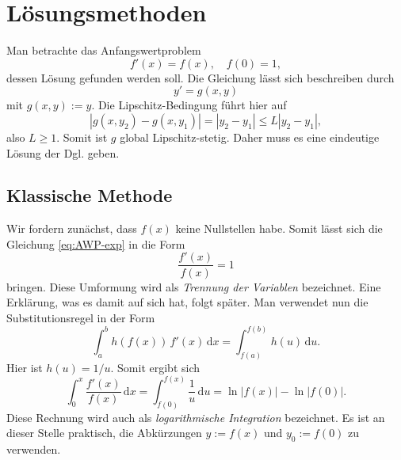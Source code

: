 \documentclass[a4paper,10pt,fleqn,twocolumn,twoside,openany]{scrartcl}
\numberwithin{equation}{section}
\theoremstyle{definition}
\begin{document}
\section{Lösungsmethoden}
Man betrachte das Anfangswertproblem
\begin{equation}\label{eq:AWP-exp}
f'(x) = f(x), \quad f(0)=1,
\end{equation}
dessen Lösung gefunden werden soll. Die Gleichung lässt sich
beschreiben durch
\begin{equation}
y' = g(x,y)
\end{equation}
mit $g(x,y):=y$. Die Lipschitz-Bedingung führt hier auf%
\begin{equation}
|g(x,y_2)-g(x,y_1)| = |y_2-y_1|\le L|y_2-y_1|,
\end{equation}
also $L\ge 1$. Somit ist $g$ global Lipschitz-stetig. Daher muss
es eine eindeutige Lösung der Dgl. geben.

\subsection{Klassische Methode}
Wir fordern zunächst, dass $f(x)$ keine Nullstellen habe. Somit
lässt sich die Gleichung \eqref{eq:AWP-exp} in die Form
\begin{equation}\label{eq:AWP-exp-Umformung}
\frac{f'(x)}{f(x)}=1
\end{equation}
bringen. Diese Umformung wird als \emph{Trennung der Variablen}
bezeichnet. Eine Erklärung, was es damit auf sich hat, folgt später.
Man verwendet nun die Substitutionsregel in der Form
\begin{equation}
\int_a^b h(f(x))\,f'(x)\,\mathrm dx
= \int_{f(a)}^{f(b)} h(u)\,\mathrm du.
\end{equation}
Hier ist $h(u)=1/u$. Somit ergibt sich
\begin{equation}
\int_0^x \frac{f'(x)}{f(x)}\,\mathrm dx
= \int_{f(0)}^{f(x)} \frac{1}{u}\,\mathrm du
= \ln|f(x)|-\ln|f(0)|.
\end{equation}
Diese Rechnung wird auch als \emph{logarithmische Integration}
bezeichnet. Es ist an dieser Stelle praktisch, die Abkürzungen
$y:=f(x)$ und $y_0:=f(0)$ zu verwenden.
\end{document}
